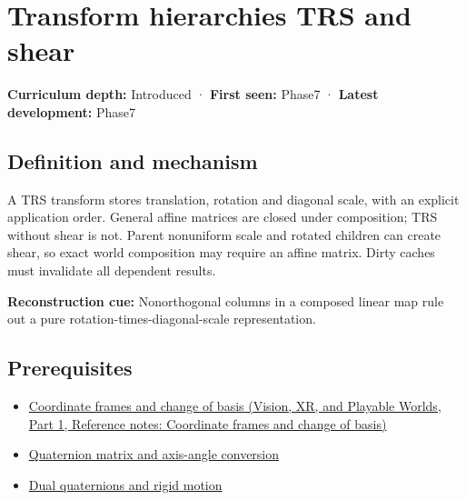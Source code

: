 \hypertarget{appendix-292c061cd47c}{}\label{referencestart:appendix-292c061cd47c}
\section{Transform hierarchies TRS and shear}\label{appendix-292c061cd47c-transform-hierarchies-trs-and-shear}

\hypertarget{appendix-292c061cd47c-transform-hierarchies-trs-and-shear}{}

\textbf{Curriculum depth:} Introduced · \textbf{First seen:} Phase7 · \textbf{Latest development:} Phase7

\begin{allmightroledefinition}

\subsection{Definition and mechanism}\label{appendix-292c061cd47c-definition-and-mechanism}

\hypertarget{appendix-292c061cd47c-definition-and-mechanism}{}

A TRS transform stores translation, rotation and diagonal scale, with an explicit application order. General affine matrices are closed under composition; TRS without shear is not. Parent nonuniform scale and rotated children can create shear, so exact world composition may require an affine matrix. Dirty caches must invalidate all dependent results.

\end{allmightroledefinition}

\textbf{Reconstruction cue:} Nonorthogonal columns in a composed linear map rule out a pure rotation-times-diagonal-scale representation.

\subsection{Prerequisites}\label{appendix-292c061cd47c-prerequisites}

\hypertarget{appendix-292c061cd47c-prerequisites}{}

\begin{itemize}
\tightlist
\item
  \href{../07-Vision-XR-and-Playable-Worlds-P01/main.pdf\#appendix-1bae9457dbc3}{Coordinate frames and change of basis (Vision, XR, and Playable Worlds, Part 1, Reference notes: Coordinate frames and change of basis)}
\item
  \hyperref[appendix-26d8da71f6c4]{Quaternion matrix and axis-angle conversion}
\item
  \hyperref[appendix-d1ea57347893]{Dual quaternions and rigid motion}
\end{itemize}

